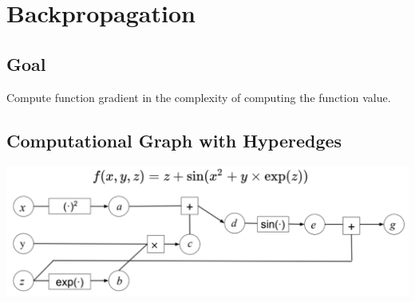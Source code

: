 \section{Backpropagation}

\subsection*{Goal}
Compute function gradient in the complexity of computing the function value.

\subsection*{Computational Graph with Hyperedges}
\begin{center}
    \includegraphics[width=\columnwidth]{img/computation-graph.png}
\end{center}
